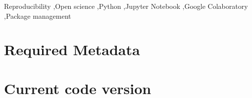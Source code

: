 \documentclass[preprint,12pt, a4paper]{elsarticle}
\begin{document}
\begin{frontmatter}
\begin{abstract}








\end{abstract}


\begin{keyword}
Reproducibility \sep Open science \sep Python \sep Jupyter Notebook \sep Google Colaboratory \sep Package management
\end{keyword}

\end{frontmatter}


\section*{Required Metadata}

\section*{Current code version}
\end{document}
